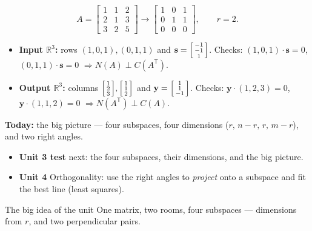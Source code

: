 \documentclass[aspectratio=169, 11pt]{beamer}
\newcommand{\yy}{\mathbf{y}}
\newcommand{\svec}{\mathbf{s}}
\newcommand{\T}{\mathsf{T}}
\begin{document}
\begin{frame}[t, plain]
  \[
    A=\begin{bmatrix} 1 & 1 & 2 \\ 2 & 1 & 3 \\ 3 & 2 & 5 \end{bmatrix}
    \longrightarrow
    \begin{bmatrix} 1 & 0 & 1 \\ 0 & 1 & 1 \\ 0 & 0 & 0 \end{bmatrix}, \qquad r=2.
  \]
  \begin{itemize}
    \setlength{\itemsep}{3pt}
    \item \textbf{Input $\mathbb{R}^3$:} rows $(1,0,1),(0,1,1)$ \; and \; $\svec=\begin{bsmallmatrix} -1\\-1\\1 \end{bsmallmatrix}$. Checks: $(1,0,1)\cdot\svec=0$, $(0,1,1)\cdot\svec=0$ \; $\Rightarrow N(A)\perp C(A^{\T})$.
    \item \textbf{Output $\mathbb{R}^3$:} columns $\begin{bsmallmatrix} 1\\2\\3 \end{bsmallmatrix},\begin{bsmallmatrix} 1\\1\\2 \end{bsmallmatrix}$ \; and \; $\yy=\begin{bsmallmatrix} 1\\1\\-1 \end{bsmallmatrix}$. Checks: $\yy\cdot(1,2,3)=0$, $\yy\cdot(1,1,2)=0$ \; $\Rightarrow N(A^{\T})\perp C(A)$.
  \end{itemize}
\end{frame}

\begin{frame}[t, plain]
  \textbf{Today:} the big picture --- four subspaces, four dimensions ($r,\,n-r,\,r,\,m-r$), and two right
  angles.\\[8pt]
  \begin{itemize}
    \setlength{\itemsep}{4pt}
    \item \textbf{Unit 3 test} next: the four subspaces, their dimensions, and the big picture.
    \item \textbf{Unit 4} Orthogonality: use the right angles to \emph{project} onto a subspace and fit the best line (least squares).
  \end{itemize}
  \vspace{4pt}
  \begin{block}{The big idea of the unit}
    One matrix, two rooms, four subspaces --- dimensions from $r$, and two perpendicular pairs.
  \end{block}
\end{frame}
\end{document}
